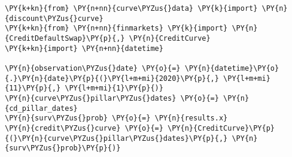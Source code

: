 \begin{Answer}
 \begin{codebox}[size=fbox, boxrule=1pt,colback=cellbackground, colframe=cellborder]
\begin{Verbatim}[commandchars=\\\{\}]
\PY{k+kn}{from} \PY{n+nn}{curve\PYZus{}data} \PY{k}{import} \PY{n}{discount\PYZus{}curve}
\PY{k+kn}{from} \PY{n+nn}{finmarkets} \PY{k}{import} \PY{n}{CreditDefaultSwap}\PY{p}{,} \PY{n}{CreditCurve}
\PY{k+kn}{import} \PY{n+nn}{datetime}

\PY{n}{observation\PYZus{}date} \PY{o}{=} \PY{n}{datetime}\PY{o}{.}\PY{n}{date}\PY{p}{(}\PY{l+m+mi}{2020}\PY{p}{,} \PY{l+m+mi}{11}\PY{p}{,} \PY{l+m+mi}{1}\PY{p}{)}
\PY{n}{curve\PYZus{}pillar\PYZus{}dates} \PY{o}{=} \PY{n}{cd_pillar_dates}
\PY{n}{surv\PYZus{}prob} \PY{o}{=} \PY{n}{results.x}
\PY{n}{credit\PYZus{}curve} \PY{o}{=} \PY{n}{CreditCurve}\PY{p}{(}\PY{n}{curve\PYZus{}pillar\PYZus{}dates}\PY{p}{,} \PY{n}{surv\PYZus{}prob}\PY{p}{)}


\end{Verbatim}
\end{codebox}
\end{Answer}
